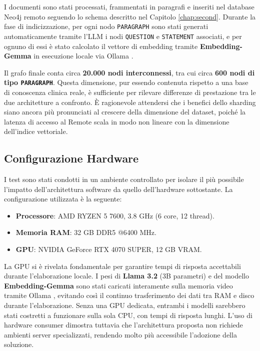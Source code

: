 I documenti sono stati processati, frammentati in paragrafi e inseriti nel database Neo4j remoto seguendo lo schema descritto nel Capitolo \ref{chap:second}. Durante la fase di indicizzazione, per ogni nodo \texttt{PARAGRAPH} sono stati generati automaticamente tramite l'LLM i nodi \texttt{QUESTION} e \texttt{STATEMENT} associati, e per ognuno di essi è stato calcolato il vettore di embedding tramite \textbf{Embedding-Gemma} \cite{embedding_gemma_2025} in esecuzione locale via Ollama \cite{ollama}.

Il grafo finale conta circa \textbf{20.000 nodi interconnessi}, tra cui circa \textbf{600 nodi di tipo \texttt{PARAGRAPH}}. Questa dimensione, pur essendo contenuta rispetto a una base di conoscenza clinica reale, è sufficiente per rilevare differenze di prestazione tra le due architetture a confronto. È ragionevole attendersi che i benefici dello sharding siano ancora più pronunciati al crescere della dimensione del dataset, poiché la latenza di accesso al Remote scala in modo non lineare con la dimensione dell'indice vettoriale.

\subsection{Configurazione Hardware}

I test sono stati condotti in un ambiente controllato per isolare il più possibile l'impatto dell'architettura software da quello dell'hardware sottostante. La configurazione utilizzata è la seguente:

\begin{itemize}
    \item \textbf{Processore}: AMD RYZEN 5 7600, 3.8 GHz (6 core, 12 thread).
    \item \textbf{Memoria RAM}: 32 GB DDR5 @6400 MHz.
    \item \textbf{GPU}: NVIDIA GeForce RTX 4070 SUPER, 12 GB VRAM.
\end{itemize}

La GPU si è rivelata fondamentale per garantire tempi di risposta accettabili durante l'elaborazione locale. I pesi di \textbf{Llama 3.2} (3B parametri) e del modello \textbf{Embedding-Gemma} sono stati caricati interamente sulla memoria video tramite Ollama \cite{ollama}, evitando così il continuo trasferimento dei dati tra RAM e disco durante l'elaborazione. Senza una GPU dedicata, entrambi i modelli sarebbero stati costretti a funzionare sulla sola CPU, con tempi di risposta lunghi. L'uso di hardware consumer dimostra tuttavia che l'architettura proposta non richiede ambienti server specializzati, rendendo molto più accessibile l'adozione della soluzione.

